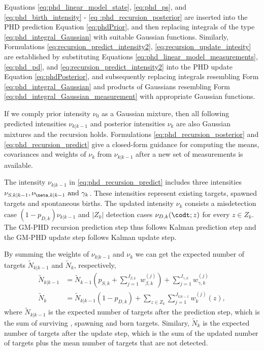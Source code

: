 Equations \eqref{eq:phd_linear_model_state}, \eqref{eq:phd_ps}, and \eqref{eq:phd_birth_intensity} - \eqref{eq
:phd_recursion_posterior} are inserted into the PHD prediction Equation \eqref{eq:phdPrior}, and then replacing
integrals of the type \eqref{eq:phd_integral_Gaussian} with suitable Gaussian functions. Similarly, Formulations \eqref{eq:recursion_predict_intensity2}, \eqref{eq:recursion_update_intesity} are established by substituting Equations \eqref{eq:phd_linear_model_measurements}, \eqref{eq:phd_pd}, and \eqref{eq:recursion_predict_intensity2} into the PHD update Equation \eqref{eq:phdPosterior}, and subsequently replacing integrals resembling Form \eqref{eq:phd_integral_Gaussian} and products of Gaussians resembling Form \eqref{eq:phd_integral_Gaussian_measurement} with appropriate Gaussian functions.

If we comply prior intensity $\nu_0$ as a Gaussian mixture, then all following predicted intensities $\nu_{k|k-1}$ and posterior intensities $\nu_k$ are also Gaussian mixtures and the recursion holds. Formulations \eqref{eq:phd_recursion_posterior} and \eqref{eq:phd_recursion_predict} give a closed-form guidance for computing the means, covariances and weights of $\nu_k$ from $\nu_{k|k-1}$ after a new set of measurements is available.

The intensity $\nu_{k|k-1}$ in \eqref{eq:phd_recursion_predict} includes three intensities $\nu_{S,k|k-1}, \nu_{\neta,k|k-1} \text{ and } \gamma_k$. These intensities represent existing targets, spawned targets and spontaneous births. The updated intensity $\nu_k$ consists a misdetection case $(1-p_{D,k})\nu_{k|k-1}$ and $|Z_k|$ detection cases $\nu_{D,k}(\codt;z)$ for every $z \in Z_k$. The GM-PHD recursion prediction step thus follows Kalman prediction step and the GM-PHD update step follows Kalman update step.

By summing the weights of $\nu_{k|k-1}$ and $\nu_k$ we can get the expected number of targets $\tilde{N}_{k|k-1}$ and $\tilde{N}_k$, respectively,
\begin{align}
    \tilde{N}_{k|k-1} &=\tilde{N}_{k-1} \left( p_{S,k} + \sum_{j=1}^{J_{\beta,k}} w_{\beta,k}^{(j)} \right) + \sum_{j=1}^{J_{\gamma,k}} w_{\gamma,k}^{(j)} \\
    \tilde{N}_k &= \tilde{N}_{k|k-1} (1 - p_{D,k}) + \sum_{z \in Z_k} \sum_{j=1}^{J_{k|k-1}} w_k^{(j)}(z),
\end{align}
where $\tilde{N}_{k|k-1}$ is the expected number of targets after the prediction step, which is the sum of surviving
, spawning and born targets. Similary, $\tilde{N}_k$ is the expected number of targets after the update step, which is the sum of the updated number of targets plus the mean number of targets
that are not detected.

